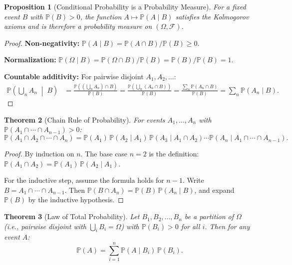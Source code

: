 \documentclass[11pt,a4paper]{article}
\theoremstyle{definition}
\theoremstyle{plain}
\newtheorem{theorem}{Theorem}[section]
\newtheorem{proposition}[theorem]{Proposition}
\theoremstyle{remark}
\newcommand{\Prob}{\mathbb{P}}
\begin{document}
\begin{proposition}[Conditional Probability is a Probability Measure]
\label{prop:cond_is_prob}
For a fixed event $B$ with $\Prob(B) > 0$, the function $A \mapsto \Prob(A \mid B)$ satisfies the Kolmogorov axioms and is therefore a probability measure on $(\Omega, \mathcal{F})$.
\end{proposition}

\begin{proof}
\textbf{Non-negativity:} $\Prob(A \mid B) = \Prob(A \cap B)/\Prob(B) \geq 0$.

\textbf{Normalization:} $\Prob(\Omega \mid B) = \Prob(\Omega \cap B)/\Prob(B) = \Prob(B)/\Prob(B) = 1$.

\textbf{Countable additivity:} For pairwise disjoint $A_1, A_2, \ldots$:
\begin{align}
    \Prob\!\left(\bigcup_n A_n \;\middle|\; B\right) &= \frac{\Prob\!\left(\left(\bigcup_n A_n\right) \cap B\right)}{\Prob(B)} = \frac{\Prob\!\left(\bigcup_n (A_n \cap B)\right)}{\Prob(B)} = \frac{\sum_n \Prob(A_n \cap B)}{\Prob(B)} = \sum_n \Prob(A_n \mid B).
\end{align}
\end{proof}

\begin{theorem}[Chain Rule of Probability]
\label{thm:chain_rule}
For events $A_1, \ldots, A_n$ with $\Prob(A_1 \cap \cdots \cap A_{n-1}) > 0$:
\begin{equation}
    \Prob(A_1 \cap A_2 \cap \cdots \cap A_n) = \Prob(A_1)\, \Prob(A_2 \mid A_1)\, \Prob(A_3 \mid A_1 \cap A_2) \cdots \Prob(A_n \mid A_1 \cap \cdots \cap A_{n-1}).
    \label{eq:chain_rule}
\end{equation}
\end{theorem}

\begin{proof}
By induction on $n$. The base case $n = 2$ is the definition: $\Prob(A_1 \cap A_2) = \Prob(A_1)\, \Prob(A_2 \mid A_1)$.

For the inductive step, assume the formula holds for $n-1$. Write $B = A_1 \cap \cdots \cap A_{n-1}$. Then $\Prob(B \cap A_n) = \Prob(B)\, \Prob(A_n \mid B)$, and expand $\Prob(B)$ by the inductive hypothesis.
\end{proof}

\begin{theorem}[Law of Total Probability]
\label{thm:total_prob}
Let $B_1, B_2, \ldots, B_n$ be a partition of $\Omega$ (i.e., pairwise disjoint with $\bigcup_i B_i = \Omega$) with $\Prob(B_i) > 0$ for all $i$. Then for any event $A$:
\begin{equation}
    \Prob(A) = \sum_{i=1}^n \Prob(A \mid B_i)\, \Prob(B_i).
    \label{eq:total_prob}
\end{equation}
\end{theorem}
\end{document}
